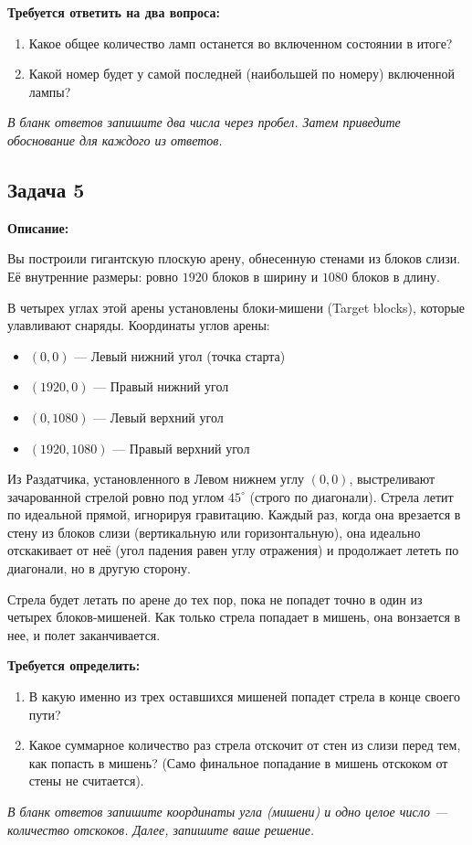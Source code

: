 \documentclass[12pt,a4paper]{article}
\begin{document}
\textbf{Требуется ответить на два вопроса:}
\begin{enumerate}
    \item Какое общее количество ламп останется во включенном состоянии в итоге?
    \item Какой номер будет у самой последней (наибольшей по номеру) включенной лампы?
\end{enumerate}

\textit{В бланк ответов запишите два числа через пробел. Затем приведите обоснование для каждого из ответов.}

\newpage

\subsection*{Задача 5}

\textbf{Описание:}

Вы построили гигантскую плоскую арену, обнесенную стенами из блоков слизи. 
Её внутренние размеры: ровно $1920$ блоков в ширину и $1080$ блоков в длину.

В четырех углах этой арены установлены блоки-мишени (Target blocks), которые улавливают снаряды. Координаты углов арены:
\begin{itemize}
    \large
    \item $(0, 0)$ — Левый нижний угол (точка старта)
    \item $(1920, 0)$ — Правый нижний угол
    \item $(0, 1080)$ — Левый верхний угол
    \item $(1920, 1080)$ — Правый верхний угол
\end{itemize}

Из Раздатчика, установленного в Левом нижнем углу $(0,0)$, выстреливают зачарованной стрелой ровно под углом $45^\circ$ (строго по диагонали). 
Стрела летит по идеальной прямой, игнорируя гравитацию. Каждый раз, когда она врезается в стену из блоков слизи (вертикальную или горизонтальную), она идеально отскакивает от неё (угол падения равен углу отражения) и продолжает лететь по диагонали, но в другую сторону. 

Стрела будет летать по арене до тех пор, пока не попадет точно в один из четырех блоков-мишеней. Как только стрела попадает в мишень, она вонзается в нее, и полет заканчивается.

\textbf{Требуется определить:}
\begin{enumerate}
    \item В какую именно из трех оставшихся мишеней попадет стрела в конце своего пути?
    \item Какое суммарное количество раз стрела отскочит от стен из слизи перед тем, как попасть в мишень? (Само финальное попадание в мишень отскоком от стены не считается).
\end{enumerate}

\textit{В бланк ответов запишите координаты угла (мишени) и одно целое число — количество отскоков. Далее, запишите ваше решение.}
\end{document}
